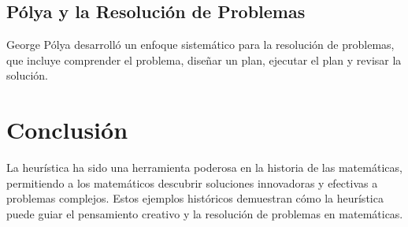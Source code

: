 \documentclass{article}
\begin{document}
\subsection{Pólya y la Resolución de Problemas}
George Pólya desarrolló un enfoque sistemático para la resolución de problemas, que incluye comprender el problema, diseñar un plan, ejecutar el plan y revisar la solución.
\section{Conclusión}
La heurística ha sido una herramienta poderosa en la historia de las matemáticas, permitiendo a los matemáticos descubrir soluciones innovadoras y efectivas a problemas complejos. Estos ejemplos históricos demuestran cómo la heurística puede guiar el pensamiento creativo y la resolución de problemas en matemáticas.
\citep{krick2001sharp}


\end{document}
